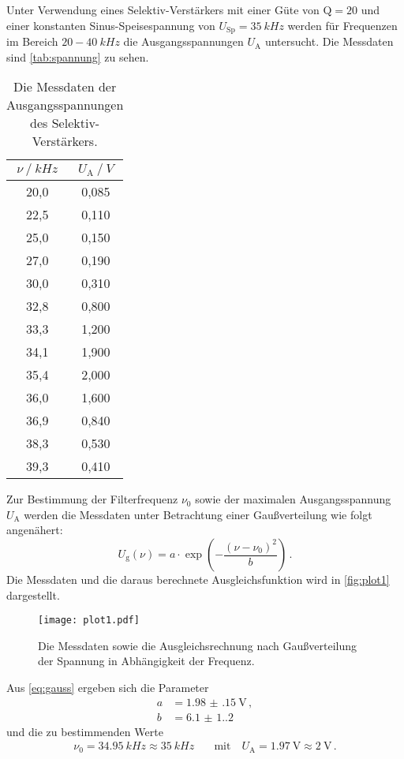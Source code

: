 Unter Verwendung eines Selektiv-Verstärkers mit einer Güte von $\text{Q} = 20$
und einer konstanten Sinus-Speisespannung von $U_\text{Sp} = \qty{35}{kHz}$ 
werden für Frequenzen im Bereich $20 - \qty{40}{kHz}$ die
Ausgangsspannungen $U_\text{A}$ untersucht.
Die Messdaten sind \autoref{tab:spannung} zu sehen.
\begin{table}[H]
  \centering
  \caption{Die Messdaten der Ausgangsspannungen des Selektiv-Verstärkers.}
  \label{tab:spannung}
  \begin{tabular}{c c}
    \toprule
    $\nu \mathbin{/} \unit{kHz}$ & $U_\text{A} \mathbin{/} \unit{V}$ \\
    \midrule
      20,0 & 0,085 \\
      22,5 & 0,110 \\
      25,0 & 0,150 \\
      27,0 & 0,190 \\
      30,0 & 0,310 \\
      32,8 & 0,800 \\
      33,3 & 1,200 \\
      34,1 & 1,900 \\
      35,4 & 2,000 \\
      36,0 & 1,600 \\
      36,9 & 0,840 \\
      38,3 & 0,530 \\
      39,3 & 0,410 \\
    \bottomrule
  \end{tabular}
\end{table}

Zur Bestimmung der Filterfrequenz $\nu_\text{0}$ sowie der maximalen Ausgangsspannung $U_\text{A}$ 
werden die Messdaten unter Betrachtung einer Gaußverteilung wie folgt angenähert:
\begin{equation}\label{eq:gauss}
  U_\text{g}(\nu) = a \cdot \exp\left( -\frac{(\nu-\nu_\text{0})^2}{b} \right) \, .
\end{equation}
Die Messdaten und die daraus berechnete Ausgleichsfunktion wird in \autoref{fig:plot1} dargestellt.
\begin{figure}
  \centering
  \texttt{[image: plot1.pdf]}
  \caption{Die Messdaten sowie die Ausgleichsrechnung nach Gaußverteilung der Spannung in Abhängigkeit der Frequenz.}
  \label{fig:plot1}
\end{figure}
Aus \autoref{eq:gauss} ergeben sich die Parameter
\begin{align*}
  a &= \qty{1.98(15)}{\volt} \, ,\\
  b &= \num{6.1(1.2)} 
\end{align*}
und die zu bestimmenden Werte
\begin{align*}
  \nu_\text{0} = \qty{34.95}{kHz} \approx \qty{35}{kHz} &\quad 
  \text{mit} \quad U_\text{A} = \qty{1.97}{\volt} \approx \qty{2}{\volt} \, .
\end{align*}




